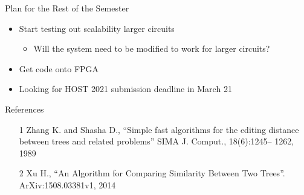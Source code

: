 \documentclass[handout]{beamer}
\begin{document}
\begin{frame}{Plan for the Rest of the Semester}
  \begin{itemize}
    \item Start testing out scalability  larger circuits
    \begin{itemize}
      \item Will the system need to be modified to work for larger circuits?
    \end{itemize}
    \item Get code onto FPGA
    \item Looking for HOST 2021 submission deadline in March 21
  \end{itemize}
\end{frame}
  
  \begin{frame}{References}
    \begin{itemize}
      \item [1] Zhang K. and Shasha D., “Simple fast algorithms for the editing
      distance between trees and related problems” SIMA J. Comput.,
      18(6):1245– 1262, 1989 \newline
      \item [2]Xu H., “An Algorithm for Comparing Similarity Between Two Trees”. ArXiv:1508.03381v1, 2014
    \end{itemize}
  \end{frame}
\end{document}
